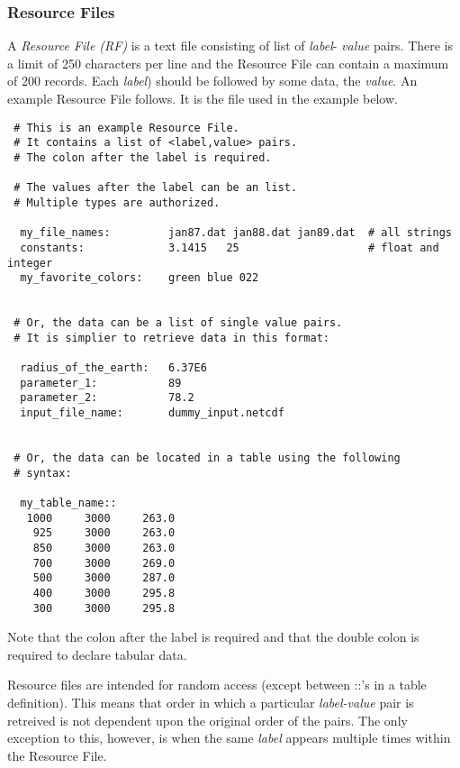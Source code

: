 
 \subsubsection{Resource Files}

   A {\em Resource File (RF)} is a text file consisting of list of {\em label}- 
   {\em value} pairs. There is a limit of 250 characters per line and the Resource 
   File can contain a maximum of 200 records. Each {\em label}) should be followed 
   by some data, the {\em value}. An example Resource File follows.  It is the file 
   used in the example below. 

 \begin{verbatim}
 # This is an example Resource File.  
 # It contains a list of <label,value> pairs.
 # The colon after the label is required. 

 # The values after the label can be an list.
 # Multiple types are authorized.
  
  my_file_names:         jan87.dat jan88.dat jan89.dat  # all strings
  constants:             3.1415   25                    # float and integer
  my_favorite_colors:    green blue 022               


 # Or, the data can be a list of single value pairs. 
 # It is simplier to retrieve data in this format:

  radius_of_the_earth:   6.37E6         
  parameter_1:           89
  parameter_2:           78.2
  input_file_name:       dummy_input.netcdf 


 # Or, the data can be located in a table using the following
 # syntax:

  my_table_name::
   1000     3000     263.0
    925     3000     263.0
    850     3000     263.0
    700     3000     269.0
    500     3000     287.0
    400     3000     295.8
    300     3000     295.8

 \end{verbatim}

 Note that the colon after the label is required and that the double colon is required
 to declare tabular data. 

 Resource files are intended for random access (except between ::'s in a 
 table definition). This means that order in which a particular 
 {\em label-value} pair is retreived is not dependent upon the original order 
 of the pairs. The only exception to this, however, is when the same {\em label} appears 
 multiple times within the Resource File.




